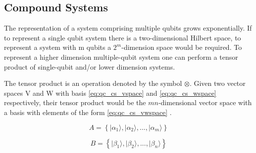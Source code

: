 \begin{comment}
Observables are deemed as the physical properties that can be measured. One way to think of them is to consider the 20 question game, where a two player game where one person thinks of an object and then the second person has a set of 20 "Yes" or "No" to discover the object, one observable could be "Is it red?". With each question the space comprising the possible answers will not increase, this means that asking two times in a row if the object is red in the game will always yield the same answer.
 
Hermitian operators are suitable for being used as observables, as their eigenvalues are real numbers.
The eigenvectors associated with the eigenvalues of the observable will correspond to the state in which the system will be after applying the Hermitian operator. Thus applying an observable to the system can be viewed as doing a projection of the system in the basis formed by the eigenvectors.  
\end{comment}

\subsection{Compound Systems}
\label{subsec:compound_systems}

The representation of a system comprising multiple qubits grows exponentially. If to represent a single qubit system there is a two-dimensional Hilbert space, to represent a system with m qubits a $2^m$-dimension space would be required. 
To represent a higher dimension multiple-qubit system one can perform a tensor product of single-qubit and/or lower dimension systems.

The tensor product is an operation denoted by the symbol $\otimes$. 
Given two vector spaces V and W with basis 
\ref{eq:qc_cs_vspace} and \ref{eq:qc_cs_wspace}
respectively, their tensor product would be the $mn$-dimensional vector space with a basis with elements of the form \ref{eq:qc_cs_vwspace} \cite{Rieffel2011}.


\begin{equation}
\label{eq:qc_cs_vspace}
A = \left\{ \vert \alpha_{1} \rangle, \vert \alpha_{2} \rangle , ..., \vert \alpha_{m} \rangle \right\}
\end{equation} 

\begin{equation} 
\label{eq:qc_cs_wspace}
B = \left\{ \vert \beta_{1} \rangle, \vert \beta_{2} \rangle , ..., \vert \beta_{n} \rangle \right\}
\end{equation} 

